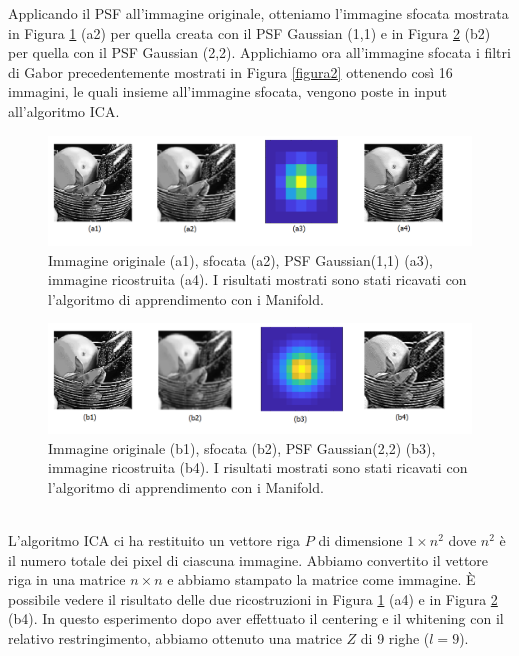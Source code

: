 \documentclass[final]{siamltex}
\begin{document}
{Applicando il PSF all'immagine originale, otteniamo l'immagine sfocata mostrata in Figura \ref{imag:gaussian11.png} (a2) per quella creata con il PSF Gaussian (1,1) e in Figura \ref{imag:gaussian22.png} (b2) per quella con il PSF Gaussian (2,2).
Applichiamo ora all'immagine sfocata i filtri di Gabor precedentemente mostrati in Figura \ref{figura2} ottenendo cos\`{i} 16 immagini, le quali insieme all'immagine sfocata, vengono poste in input all'algoritmo ICA.\\
%
\begin{figure}[h!]
\begin{center}
\includegraphics[width=1.1\columnwidth]{totale11.png}
\caption{Immagine originale (a1), sfocata (a2), PSF Gaussian(1,1) (a3), immagine ricostruita (a4). I risultati mostrati sono stati ricavati con l'algoritmo di apprendimento con i Manifold.}
\label{imag:gaussian11.png}
\end{center}
\end{figure}
%
\begin{figure}[h!]
\begin{center}
\includegraphics[width=1.1\columnwidth]{totale22.png}
\caption{Immagine originale (b1), sfocata (b2), PSF Gaussian(2,2) (b3), immagine ricostruita (b4). I risultati mostrati sono stati ricavati con l'algoritmo di apprendimento con i Manifold.}
\label{imag:gaussian22.png}
\end{center}
\end{figure}
%
\\
L'algoritmo ICA ci ha restituito un vettore riga $P$ di dimensione $1 \times n^2$ dove $n^2$ \`{e} il numero totale dei pixel di ciascuna immagine. Abbiamo convertito il vettore riga in una matrice $n \times n$ e abbiamo stampato la matrice come immagine. \`{E} possibile vedere il risultato delle due ricostruzioni in Figura \ref{imag:gaussian11.png} (a4) e in Figura \ref{imag:gaussian22.png} (b4). In questo esperimento dopo aver effettuato il centering e il whitening con il relativo restringimento, abbiamo ottenuto una matrice $Z$ di 9 righe ($l=9$). \\

}
\end{document}
